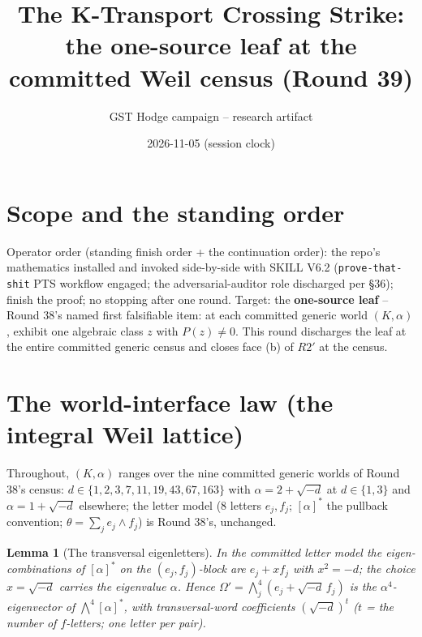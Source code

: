 \documentclass[11pt]{article}
\title{The K-Transport Crossing Strike:\\
the one-source leaf at the committed Weil census (Round 39)}
\author{GST Hodge campaign -- research artifact}
\date{2026-11-05 (session clock)}
\newtheorem{lemma}[theorem]{Lemma}
\begin{document}
\maketitle

\section*{Scope and the standing order}

Operator order (standing finish order + the continuation order): the repo's
mathematics installed and invoked side-by-side with SKILL V6.2
(\texttt{prove-that-shit} PTS workflow engaged; the adversarial-auditor role
discharged per \S36); finish the proof; no stopping after one round. Target:
the \textbf{one-source leaf} -- Round 38's named first falsifiable item: at
each committed generic world $(K,\alpha)$, exhibit one algebraic class $z$
with $P(z)\neq 0$. This round discharges the leaf at the entire committed
generic census and closes face (b) of $R2'$ at the census.

\section{The world-interface law (the integral Weil lattice)}

Throughout, $(K,\alpha)$ ranges over the nine committed generic worlds of
Round 38's census: $d\in\{1,2,3,7,11,19,43,67,163\}$ with
$\alpha = 2+\sqrt{-d}$ at $d\in\{1,3\}$ and $\alpha=1+\sqrt{-d}$ elsewhere;
the letter model (8 letters $e_j,f_j$; $[\alpha]^*$ the pullback convention;
$\theta=\sum_j e_j\wedge f_j$) is Round 38's, unchanged.

\begin{lemma}[The transversal eigenletters]\label{lem:eigen}
In the committed letter model the eigen-combinations of $[\alpha]^*$ on the
$(e_j,f_j)$-block are $e_j + x f_j$ with $x^2 = -d$; the choice
$x = \sqrt{-d}$ carries the eigenvalue $\alpha$. Hence
$\Omega' = \bigwedge^4_j (e_j + \sqrt{-d}\, f_j)$ is the $\alpha^4$-eigenvector
of $\bigwedge^4[\alpha]^*$, with transversal-word coefficients
$(\sqrt{-d})^t$ ($t$ = the number of $f$-letters; one letter per pair).
\end{lemma}
\end{document}
